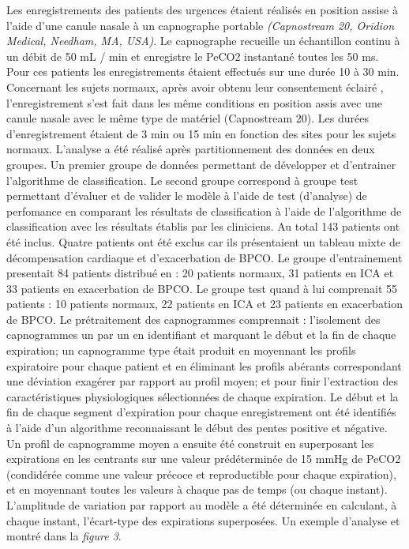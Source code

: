 \documentclass[12pt,]{article}
\begin{document}
Les enregistrements des patients des urgences étaient réalisés en
position assise à l'aide d'une canule nasale à un capnographe portable
\emph{(Capnostream 20, Oridion Medical, Needham, MA, USA)}. Le
capnographe recueille un échantillon continu à un débit de 50 mL / min
et enregistre le PeCO2 instantané toutes les 50 ms. Pour ces patients
les enregistrements étaient effectués sur une durée 10 à 30 min.
Concernant les sujets normaux, après avoir obtenu leur consentement
éclairé , l'enregistrement s'est fait dans les même conditions en
position assis avec une canule nasale avec le même type de matériel
(Capnostream 20). Les durées d'enregistrement étaient de 3 min ou 15 min
en fonction des sites pour les sujets normaux. L'analyse a été réalisé
après partitionnement des données en deux groupes. Un premier groupe de
données permettant de développer et d'entrainer l'algorithme de
classification. Le second groupe correspond à groupe test permettant
d'évaluer et de valider le modèle à l'aide de test (d'analyse) de
perfomance en comparant les résultats de classification à l'aide de
l'algorithme de classification avec les résultats établis par les
cliniciens. Au total 143 patients ont été inclus. Quatre patients ont
été exclus car ils présentaient un tableau mixte de décompensation
cardiaque et d'exacerbation de BPCO. Le groupe d'entrainement presentait
84 patients distribué en : 20 patients normaux, 31 patients en ICA et 33
patients en exacerbation de BPCO. Le groupe test quand à lui comprenait
55 patients : 10 patients normaux, 22 patients en ICA et 23 patients en
exacerbation de BPCO. Le prétraitement des capnogrammes comprennait :
l'isolement des capnogrammes un par un en identifiant et marquant le
début et la fin de chaque expiration; un capnogramme type était produit
en moyennant les profils expiratoire pour chaque patient et en éliminant
les profils abérants correspondant une déviation exagérer par rapport au
profil moyen; et pour finir l'extraction des caractéristiques
physiologiques sélectionnées de chaque expiration. Le début et la fin de
chaque segment d'expiration pour chaque enregistrement ont été
identifiés à l'aide d'un algorithme reconnaissant le début des pentes
positive et négative. Un profil de capnogramme moyen a ensuite été
construit en superposant les expirations en les centrants sur une valeur
prédéterminée de 15 mmHg de PeCO2 (condidérée comme une valeur précoce
et reproductible pour chaque expiration), et en moyennant toutes les
valeurs à chaque pas de temps (ou chaque instant). L'amplitude de
variation par rapport au modèle a été déterminée en calculant, à chaque
instant, l'écart-type des expirations superposées. Un exemple d'analyse
et montré dans la \emph{figure 3}.
\end{document}
